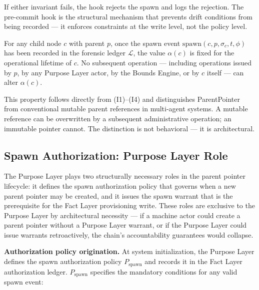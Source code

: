 If either invariant fails, the hook rejects the spawn and logs the rejection. The pre-commit hook is the structural mechanism that prevents drift conditions from being recorded — it enforces constraints at the write level, not the policy level.

\begin{prop}\label{prop:parent-pointer-immutable}
For any child node $c$ with parent $p$, once the spawn event $\mathrm{spawn}(c, p, \sigma_c, t, \phi)$ has been recorded in the forensic ledger $\mathcal{L}$, the value $\alpha(c)$ is fixed for the operational lifetime of $c$. No subsequent operation — including operations issued by $p$, by any Purpose Layer actor, by the Bounds Engine, or by $c$ itself — can alter $\alpha(c)$.
\end{prop}

This property follows directly from (I1)–(I4) and distinguishes ParentPointer from conventional mutable parent references in multi-agent systems. A mutable reference can be overwritten by a subsequent administrative operation; an immutable pointer cannot. The distinction is not behavioral — it is architectural.

\subsection{Spawn Authorization: Purpose Layer Role}
\label{sec:purpose-layer-authorization}

The Purpose Layer plays two structurally necessary roles in the parent pointer lifecycle: it defines the spawn authorization policy that governs when a new parent pointer may be created, and it issues the spawn warrant that is the prerequisite for the Fact Layer provisioning write. These roles are exclusive to the Purpose Layer by architectural necessity — if a machine actor could create a parent pointer without a Purpose Layer warrant, or if the Purpose Layer could issue warrants retroactively, the chain's accountability guarantees would collapse.

\medskip
\noindent\textbf{Authorization policy origination.} At system initialization, the Purpose Layer defines the spawn authorization policy $P_{\text{spawn}}$ and records it in the Fact Layer authorization ledger. $P_{\text{spawn}}$ specifies the mandatory conditions for any valid spawn event:

